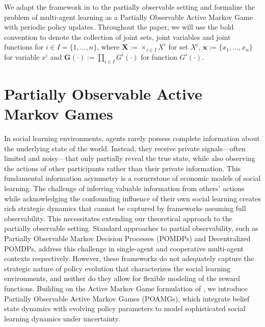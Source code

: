 We adapt the framework in \citet{kim2022influencing} to the partially observable setting and formalize the problem of multi-agent learning as a Partially Observable Active Markov Game with periodic policy updates. Throughout the paper, we will use the bold convention to denote the collection of joint sets, joint variables and joint functions for $i \in I =\{1,\ldots,n\}$, where $\boldsymbol{X} := \times_{i \in I} X^i$ for set $X^i$, $\boldsymbol{x} := \{x_1, \ldots, x_n\}$ for variable $x^i$ and $\boldsymbol{G}(\cdot) := \prod_{i \in I} G^i(\cdot)$ for function $G^i(\cdot)$.

\section{Partially Observable Active Markov Games}
In social learning environments, agents rarely possess complete information about the underlying state of the world. Instead, they receive private signals—often limited and noisy—that only partially reveal the true state, while also observing the actions of other participants rather than their private information. This fundamental information asymmetry is a cornerstone of economic models of social learning. The challenge of inferring valuable information from others' actions while acknowledging the confounding influence of their own social learning creates rich strategic dynamics that cannot be captured by frameworks assuming full observability. This necessitates extending our theoretical approach to the partially observable setting. Standard approaches to partial observability, such as Partially Observable Markov Decision Processes (POMDPs) and Decentralized POMDPs, address this challenge in single-agent and cooperative multi-agent contexts respectively. However, these frameworks do not adequately capture the strategic nature of policy evolution that characterizes the social learning environments, and neither do they allow for flexible modeling of the reward functions. Building on the Active Markov Game formulation of \citet{kim2022influencing}, we introduce Partially Observable Active Markov Games (POAMGs), which integrate belief state dynamics with evolving policy parameters to model sophisticated social learning dynamics under uncertainty.

